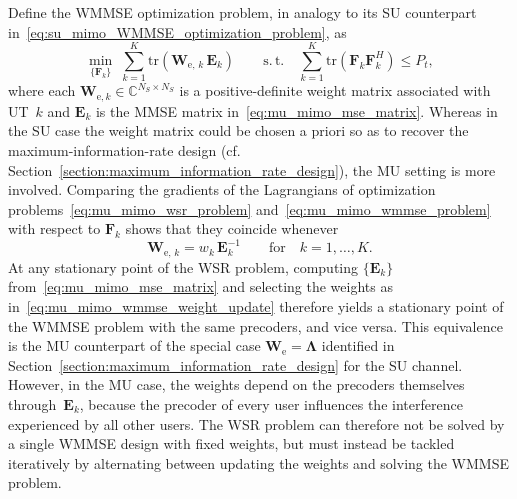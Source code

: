 Define the \ac{WMMSE} optimization problem, in analogy to its \ac{SU} counterpart in~\eqref{eq:su_mimo_WMMSE_optimization_problem}, as
\begin{equation}
\label{eq:mu_mimo_wmmse_problem}
    \min_{\{\mathbf{F}_k\}} \; \sum_{k=1}^{K} \mathrm{tr}(\mathbf{W}_{\mathrm{e}, \,k} \, \mathbf{E}_k) \qquad \mathrm{s.\,t.} \quad \sum_{k=1}^{K} \mathrm{tr}(\mathbf{F}_k \mathbf{F}_k^H) \leq P_t,
\end{equation}
where each $\mathbf{W}_{\mathrm{e}, k} \in \mathbb{C}^{N_S \times N_S}$ is a positive-definite weight matrix associated with \ac{UT}~$k$ and $\mathbf{E}_k$ is the \ac{MMSE} matrix in~\eqref{eq:mu_mimo_mse_matrix}.
Whereas in the \ac{SU} case the weight matrix could be chosen a priori so as to recover the maximum-information-rate design (cf. Section~\ref{section:maximum_information_rate_design}), the \ac{MU} setting is more involved.
Comparing the gradients of the Lagrangians of optimization problems~\eqref{eq:mu_mimo_wsr_problem} and~\eqref{eq:mu_mimo_wmmse_problem} with respect to $\mathbf{F}_k$ shows that they coincide whenever~\cite{WMMSE_precoding}
\begin{equation}
\label{eq:mu_mimo_wmmse_weight_update}
    \mathbf{W}_{\mathrm{e}, \,k} = w_k \, \mathbf{E}_k^{-1} \qquad \text{for} \quad k = 1, \dots, K.
\end{equation}
At any stationary point of the \ac{WSR} problem, computing $\{\mathbf{E}_k\}$ from~\eqref{eq:mu_mimo_mse_matrix} and selecting the weights as in~\eqref{eq:mu_mimo_wmmse_weight_update} therefore yields a stationary point of the \ac{WMMSE} problem with the same precoders, and vice versa.
This equivalence is the \ac{MU} counterpart of the special case $\mathbf{W}_{\mathrm{e}} = \mathbf{\Lambda}$ identified in Section~\ref{section:maximum_information_rate_design} for the \ac{SU} channel.
However, in the \ac{MU} case, the weights depend on the precoders themselves through~$\mathbf{E}_k$, because the precoder of every user influences the interference experienced by all other users.
The \ac{WSR} problem can therefore not be solved by a single \ac{WMMSE} design with fixed weights, but must instead be tackled iteratively by alternating between updating the weights and solving the \ac{WMMSE} problem.
\medskip

